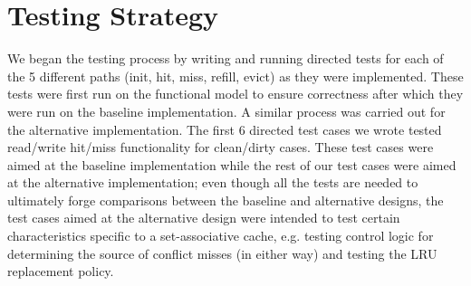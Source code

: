 \documentclass[10pt]{article}
\begin{document}
\section{Testing Strategy}

We began the testing process by writing and running directed tests for each of the 5 different paths (init, hit, miss, refill, evict) as they were implemented. These tests were first run on the functional model to ensure correctness after which they were run on the baseline implementation. A similar process was carried out for the alternative implementation. The first 6 directed test cases we wrote tested read/write hit/miss functionality for clean/dirty cases. These test cases were aimed at the baseline implementation while the rest of our test cases were aimed at the alternative implementation; even though all the tests are needed to ultimately forge comparisons between the baseline and alternative designs, the test cases aimed at the alternative design were intended to test certain characteristics specific to a set-associative cache, e.g. testing control logic for determining the source of conflict misses (in either way) and testing the LRU replacement policy.





\end{document}
